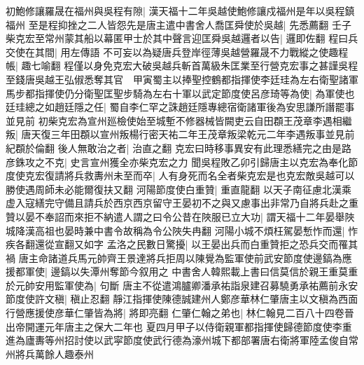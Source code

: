 初鮑修讓羅晟在福州與吳程有隙|{
	漢天福十二年吳越使鮑修讓戍福州是年以吳程鎮福州}
至是程抑挫之二人皆怨先是唐主遣中書舍人喬匡舜使於吳越|{
	先悉薦翻}
壬子柴克宏至常州蒙其船以幕匿甲士於其中聲言迎匡舜吳越邏者以告|{
	邏即佐翻}
程曰兵交使在其間|{
	用左傳語}
不可妄以為疑唐兵登岸徑薄吳越營羅晟不力戰縱之使趣程帳|{
	趣七喻翻}
程僅以身免克宏大破吳越兵斬首萬級朱匡業至行營克宏事之甚謹吳程至錢唐吳越王弘俶悉奪其官　甲寅蜀主以捧聖控鶴都指揮使李廷珪為左右衛聖諸軍馬步都指揮使仍分衛聖匡聖步騎為左右十軍以武定節度使呂彦琦等為使|{
	為軍使也}
廷珪總之如趙廷隱之任|{
	蜀自李仁罕之誅趙廷隱專總宿衛諸軍後為安思謙所譖罷事並見前}
初柴克宏為宣州廵檢使始至城塹不修器械皆闕吏云自田頵王茂章李遇相繼叛|{
	唐天復三年田頵以宣州叛楊行密天祐二年王茂章叛梁乾元二年李遇叛事並見前紀頵於倫翻}
後人無敢治之者|{
	治直之翻}
克宏曰時移事異安有此理悉繕完之由是路彦銖攻之不克|{
	史言宣州獲全亦柴克宏之力}
聞吳程敗乙卯引歸唐主以克宏為奉化節度使克宏復請將兵救夀州未至而卒|{
	人有身死而名全者柴克宏是也克宏敵吳越可以勝使遇周師未必能爾復扶又翻}
河陽節度使白重贊|{
	重直龍翻}
以天子南征慮北漢乘虚入寇繕完守備且請兵於西京西京留守王晏初不之與又慮事出非常乃自將兵赴之重贊以晏不奉詔而來拒不納遣人謂之曰令公昔在陜服已立大功|{
	謂天福十二年晏舉陜城降漢高祖也晏時兼中書令故稱為令公陜失冉翻}
河陽小城不煩枉駕晏慙怍而還|{
	怍疾各翻還從宣翻又如字}
孟洛之民數日驚擾|{
	以王晏出兵而白重贊拒之恐兵交而罹其禍}
唐主命諸道兵馬元帥齊王景達將兵拒周以陳覺為監軍使前武安節度使邊鎬為應援都軍使|{
	邊鎬以失潭州奪節今叙用之}
中書舍人韓熙載上書曰信莫信於親王重莫重於元帥安用監軍使為|{
	句斷}
唐主不從遣鴻臚卿潘承祐詣泉建召募驍勇承祐薦前永安節度使許文稹|{
	稹止忍翻}
靜江指揮使陳德誠建州人鄭彦華林仁肇唐主以文稹為西面行營應援使彦華仁肇皆為將|{
	將即亮翻}
仁肇仁翰之弟也|{
	林仁翰見二百八十四卷晉出帝開運元年唐主之保大二年也}
夏四月甲子以侍衛親軍都指揮使歸德節度使李重進為廬夀等州招討使以武寜節度使武行德為濠州城下都部署唐右衛將軍陸孟俊自常州將兵萬餘人趣泰州

